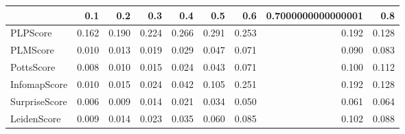 \begin{tabular}{lrrrrrrrr}
\toprule
{} &   0.1 &   0.2 &   0.3 &   0.4 &   0.5 &   0.6 & 0.7000000000000001 &   0.8 \\
\midrule
PLPScore      & 0.162 & 0.190 & 0.224 & 0.266 & 0.291 & 0.253 &              0.192 & 0.128 \\
PLMScore      & 0.010 & 0.013 & 0.019 & 0.029 & 0.047 & 0.071 &              0.090 & 0.083 \\
PottsScore    & 0.008 & 0.010 & 0.015 & 0.024 & 0.043 & 0.071 &              0.100 & 0.112 \\
InfomapScore  & 0.010 & 0.015 & 0.024 & 0.042 & 0.105 & 0.251 &              0.192 & 0.128 \\
SurpriseScore & 0.006 & 0.009 & 0.014 & 0.021 & 0.034 & 0.050 &              0.061 & 0.064 \\
LeidenScore   & 0.009 & 0.014 & 0.023 & 0.035 & 0.060 & 0.085 &              0.102 & 0.088 \\
\bottomrule
\end{tabular}
